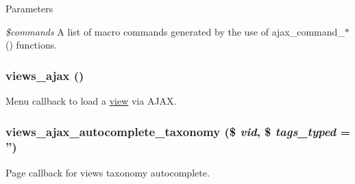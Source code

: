 \begin{DoxyParams}{Parameters}
\item[{\em \$commands}]A list of macro commands generated by the use of ajax\_\-command\_\-$\ast$() functions. \end{DoxyParams}
\hypertarget{group__ajax_ga5f1adff7f07ea45d8ab62b456ffdd6e0}{
\subsubsection[{views\_\-ajax}]{\setlength{\rightskip}{0pt plus 5cm}views\_\-ajax ()}}
\label{group__ajax_ga5f1adff7f07ea45d8ab62b456ffdd6e0}
Menu callback to load a \hyperlink{classview}{view} via AJAX. \hypertarget{group__ajax_ga4aed960e2ee6b6e516e609188852c0f6}{
\subsubsection[{views\_\-ajax\_\-autocomplete\_\-taxonomy}]{\setlength{\rightskip}{0pt plus 5cm}views\_\-ajax\_\-autocomplete\_\-taxonomy (\$ {\em vid}, \/  \$ {\em tags\_\-typed} = {\ttfamily ''})}}
\label{group__ajax_ga4aed960e2ee6b6e516e609188852c0f6}
Page callback for views taxonomy autocomplete.


